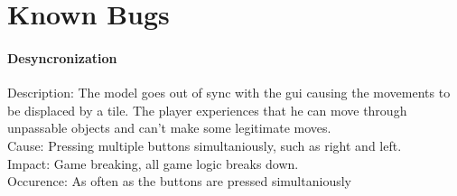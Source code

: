 \section{Known Bugs}
\paragraph{Desyncronization} Description: The model goes out of sync with the gui causing the movements to be displaced by a tile. The player experiences that he can move through unpassable objects and can't make some legitimate moves.\\
Cause: Pressing multiple buttons simultaniously, such as right and left.\\
Impact: Game breaking, all game logic breaks down.\\
Occurence: As often as the buttons are pressed simultaniously\\

